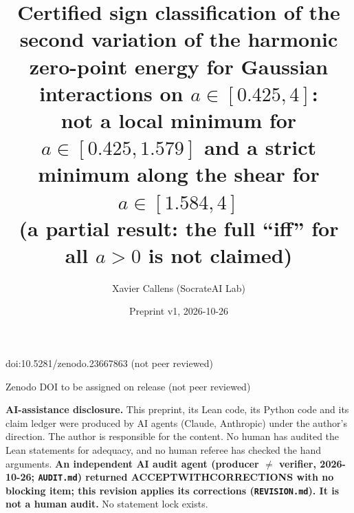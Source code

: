 \documentclass[10pt]{article}
\title{Certified sign classification of the second variation of the harmonic zero-point energy for Gaussian interactions on $a\in[0.425,4]$:\\
not a local minimum for $a\in[0.425,1.579]$ and a strict minimum along the shear for $a\in[1.584,4]$\\[2pt]
\normalsize (a partial result: the full ``iff'' for all $a>0$ is not claimed)}
\author{Xavier Callens (SocrateAI Lab)}
\date{Preprint v1, 2026-10-26}
\renewcommand{\_}{\textunderscore\penalty0\hspace{0pt}}
\begin{document}
\maketitle
\begin{center}\small doi:10.5281/zenodo.23667863 \quad (not peer reviewed)\end{center}

\begin{center}\small Zenodo DOI to be assigned on release \quad (not peer reviewed)\end{center}

\noindent\textbf{AI-assistance disclosure.} This preprint, its Lean code, its Python code and its claim ledger were
produced by AI agents (Claude, Anthropic) under the author's direction. The author is responsible for the content. No human
has audited the Lean statements for adequacy, and no human referee has checked the hand arguments. \textbf{An independent AI audit agent
(producer $\ne$ verifier, 2026-10-26; \texttt{AUDIT.md}) returned ACCEPT\_WITH\_CORRECTIONS with no blocking item; this revision applies its corrections
(\texttt{REVISION.md}). It is not a human audit.} No statement lock exists.
\end{document}
